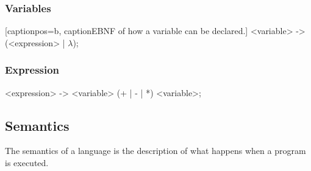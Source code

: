 \subsubsection*{Variables}[captionpos=b, caption{EBNF of how a variable can be declared.}]
<variable> -> (<expression> | $\lambda$);

\subsubsection*{Expression}
<expression> -> <variable> (+ | - | *) <variable>;

\subsection{Semantics}
The semantics of a language is the description of what happens when a program is executed.